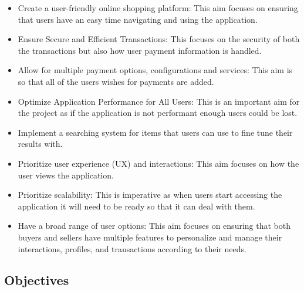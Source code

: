 \documentclass[]{project_report}
\begin{document}
\begin{itemize}
    \item Create a user-friendly online shopping platform: This aim focuses on ensuring that users have an easy time navigating and using the application.
    \item Ensure Secure and Efficient Transactions: This focuses on the security of both the transactions but also how user payment information is handled.
    \item Allow for multiple payment options, configurations and services: This aim is so that all of the users wishes for payments are added.
    \item Optimize Application Performance for All Users: This is an important aim for the project as if the application is not performant enough users could be lost.
    \item Implement a searching system for items that users can use to fine tune their results with.
    \item Prioritize user experience (UX) and interactions: This aim focuses on how the user views the application.
    \item Prioritize scalability: This is imperative as when users start accessing the application it will need to be ready so that it can deal with them.
    \item Have a broad range of user options: This aim focuses on ensuring that both buyers and sellers have multiple features to personalize and manage their interactions, profiles, and transactions according to their needs.
\end{itemize}

\subsection{Objectives}
\end{document}
